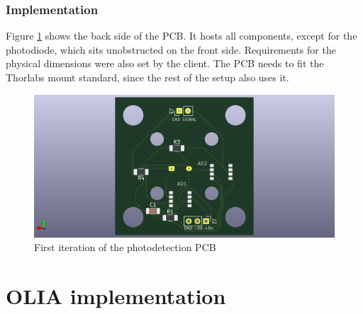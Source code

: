 \subsubsection{Implementation} 
Figure \ref{fig:photodetecogpcb} shows the back side of the PCB. It hosts all components, except for the photodiode, which sits unobstructed on the front side. Requirements for the physical dimensions were also set by the client. The PCB needs to fit the Thorlabs mount standard, since the rest of the setup also uses it. 

\begin{figure}[ht]
	\centering
	\includegraphics[width=0.7\linewidth]{img/photodetec_og_pcb}
	\caption{First iteration of the photodetection PCB}
	\label{fig:photodetecogpcb}
\end{figure}


\section{OLIA implementation}
